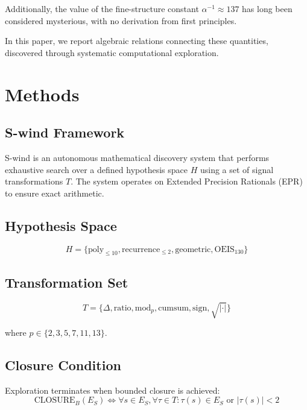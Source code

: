 \documentclass[twocolumn,prl,aps,superscriptaddress]{revtex4-2}
\begin{document}
Additionally, the value of the fine-structure constant $\alpha^{-1} \approx 137$ 
has long been considered mysterious, with no derivation from first principles.

In this paper, we report algebraic relations connecting these quantities, 
discovered through systematic computational exploration.

\section{Methods}

\subsection{S-wind Framework}

S-wind is an autonomous mathematical discovery system that performs exhaustive 
search over a defined hypothesis space $H$ using a set of signal transformations $T$.
The system operates on Extended Precision Rationals (EPR) to ensure exact arithmetic.

\subsection{Hypothesis Space}

\begin{equation}
H = \{\text{poly}_{\leq 10}, \text{recurrence}_{\leq 2}, \text{geometric}, \text{OEIS}_{130}\}
\end{equation}

\subsection{Transformation Set}

\begin{equation}
T = \{\Delta, \text{ratio}, \text{mod}_p, \text{cumsum}, \text{sign}, \sqrt{|\cdot|}\}
\end{equation}

where $p \in \{2, 3, 5, 7, 11, 13\}$.

\subsection{Closure Condition}

Exploration terminates when bounded closure is achieved:
\begin{equation}
\text{CLOSURE}_B(E_S) \Leftrightarrow \forall s \in E_S, \forall \tau \in T: 
\tau(s) \in E_S \text{ or } |\tau(s)| < 2
\end{equation}
\end{document}

